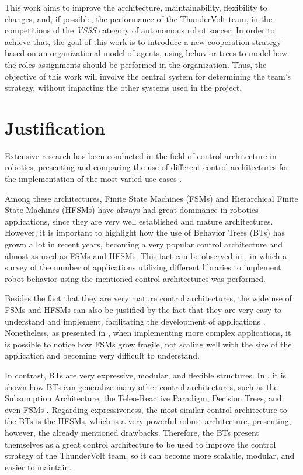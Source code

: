 This work aims to improve the architecture, maintainability, flexibility to changes, and, if possible, the performance of the ThunderVolt team, in the competitions of the \textit{VSSS} category of autonomous robot soccer. In order to achieve that, the goal of this work is to introduce a new cooperation strategy based on an organizational model \cite{Moise} of agents, using behavior trees to model how the roles assignments should be performed in the organization. Thus, the objective of this work will involve the central system for determining the team's strategy, without impacting the other systems used in the project.

\section{Justification}

Extensive research has been conducted in the field of control architecture in robotics, presenting and comparing the use of different control architectures for the implementation of the most varied use cases \cite{BTsInRobotics, SurveyBTs, Expressiveness, iovino2022programming, RobotArchitectureInDynamicEnvironment, PetriNetsRobotics, billington2010plausible, BTsAndFSMApplications}. 

Among these architectures, Finite State Machines (FSMs) and Hierarchical Finite State Machines (HFSMs) have always had great dominance in robotics applications, since they are very well established and mature architectures. However, it is important to highlight how the use of Behavior Trees (BTs) has grown a lot in recent years, becoming a very popular control architecture and almost as used as FSMs and HFSMs. This fact can be observed in \cite{BTsAndFSMApplications}, in which a survey of the number of applications utilizing different libraries to implement robot behavior using the mentioned control architectures was performed.

Besides the fact that they are very mature control architectures, the wide use of FSMs and HFSMs can also be justified by the fact that they are very easy to understand and implement, facilitating the development of applications \cite{BTsInRobotics, Expressiveness, iovino2022programming}. Nonetheless, as presented in \cite{BTsInRobotics, SurveyBTs, iovino2022programming}, when implementing more complex applications, it is possible to notice how FSMs grow fragile, not scaling well with the size of the application and becoming very difficult to understand.

In contrast, BTs are very expressive, modular, and flexible structures. In \cite{BTsInRobotics}, it is shown how BTs can generalize many other control architectures, such as the Subsumption Architecture, the Teleo-Reactive Paradigm, Decision Trees, and even FSMs \cite{BTsInRobotics, Expressiveness,  iovino2022programming}. Regarding expressiveness, the most similar control architecture to the BTs is the HFSMs, which is a very powerful robust architecture, presenting, however, the already mentioned drawbacks. Therefore, the BTs present themselves as a great control architecture to be used to improve the control strategy of the ThunderVolt team, so it can become more scalable, modular, and easier to maintain.

